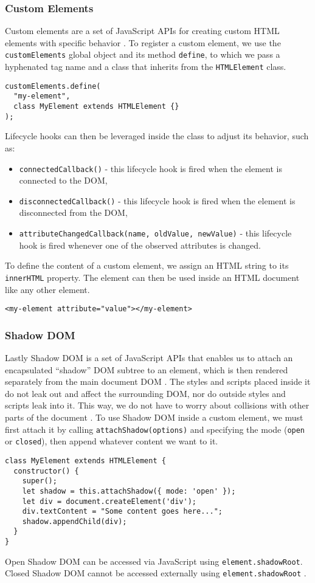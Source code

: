 \subsubsection{Custom Elements}
Custom elements are a set of JavaScript APIs for creating custom HTML elements with specific behavior \cite{MDNWebComponents}. To register a custom element, we use the \texttt{customElements} global object and its method \texttt{define}, to which we pass a hyphenated tag name and a class that inherits from the \texttt{HTMLElement} class.
\begin{verbatim}
customElements.define(
  "my-element", 
  class MyElement extends HTMLElement {}
);
\end{verbatim}
Lifecycle hooks can then be leveraged inside the class to adjust its behavior, such as:
\begin{itemize}
  \item \texttt{connectedCallback()} - this lifecycle hook is fired when the element is connected to the DOM,
  \item \texttt{disconnectedCallback()} - this lifecycle hook is fired when the element is disconnected from the DOM,
  \item \texttt{attributeChangedCallback(name, oldValue, newValue)} - this lifecycle hook is fired whenever one of the observed attributes is changed.
\end{itemize}
To define the content of a custom element, we assign an HTML string to its \texttt{innerHTML} property. The element can then be used inside an HTML document like any other element.
\begin{verbatim}
<my-element attribute="value"></my-element>
\end{verbatim}

\subsubsection{Shadow DOM}
Lastly Shadow DOM is a set of JavaScript APIs that enables us to attach an encapsulated ``shadow'' DOM subtree to an element, which is then rendered separately from the main document DOM \cite{MDNWebComponents}. The styles and scripts placed inside it do not leak out and affect the surrounding DOM, nor do outside styles and scripts leak into it. This way, we do not have to worry about collisions with other parts of the document \cite{EisenbergWebComponents}. To use Shadow DOM inside a custom element, we must first attach it by calling \texttt{attachShadow(options)} and specifying the mode (\texttt{open} or \texttt{closed}), then append whatever content we want to it.
\begin{verbatim}
class MyElement extends HTMLElement {
  constructor() {
    super();
    let shadow = this.attachShadow({ mode: 'open' });
    let div = document.createElement('div');
    div.textContent = "Some content goes here...";
    shadow.appendChild(div);
  }
}
\end{verbatim}
Open Shadow DOM can be accessed via JavaScript using \texttt{element.shadowRoot}. Closed Shadow DOM cannot be accessed externally using \texttt{element.shadowRoot} \cite{MDNWebComponents}.


